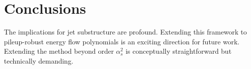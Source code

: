 \section{Conclusions}\label{sec:conclusions}

The implications for jet substructure are profound. Extending this
framework to pileup-robust energy flow polynomials is an exciting
direction for future work. Extending the method beyond order
$\alpha_s^2$ is conceptually straightforward but technically demanding.

